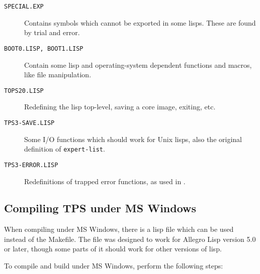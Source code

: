 \begin{description}
\item[{\tt SPECIAL.EXP}]	 Contains symbols which cannot be exported in some lisps. These
are found by trial and error.

\item[{\tt BOOT0.LISP, BOOT1.LISP}]	 Contain  some  lisp and operating-system dependent
functions and macros, like file manipulation.

\item[{\tt TOPS20.LISP}]	 Redefining the lisp top-level, saving a core image, exiting, etc.

\item[{\tt TPS3-SAVE.LISP}]	 Some I/O functions which should work for Unix lisps, also the
original definition of {\tt expert-list}.

\item[{\tt TPS3-ERROR.LISP}]	 Redefinitions of trapped error functions, as used in {\ETPS}.
\end{description}

\subsection{Compiling TPS under MS Windows}\label{set-up-windows}

When compiling {\TPS} under MS Windows,
there is a lisp file 
which can be used instead of the Makefile.  The file
 was designed to work
for Allegro Lisp version 5.0 or later, though some parts of
it should work for other versions of lisp.

To compile and build {\TPS} under MS Windows, perform the following steps:

